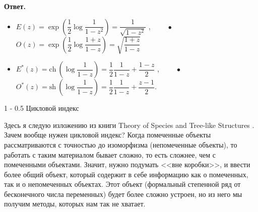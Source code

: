 \documentclass{article}
\makeatletter
\theoremstyle{definition}
\renewcommand{\section}{\@startsection
{section}%
{1}%
{\z@}%
{-\baselineskip}%
{0.5\baselineskip}%
{\centering\large\scshape}} %
\makeatother
\begin{document}
\textbf{Ответ.}

\begin{itemize}
	\item \( E(z) = \exp\left(\dfrac12 \log \dfrac{1}{1-z^2}\right) = 
	\dfrac{1}{\sqrt{1 - z^2}} \) , 
	\( \qquad \bullet \) \( O(z) = \exp\left(\dfrac12 \log 
	\dfrac{1+z}{1-z}\right) = 
	\sqrt{\dfrac{1+z}{1-z}} \)
	\item \( E^{*}(z) = \mathrm{ch}\ \left(\log \dfrac{1}{1 - z}\right) = 
	\dfrac12 \dfrac{1}{1 - z} + \dfrac{1 - z}{2} \) , \( \qquad \bullet \)
	\( O^{*}(z) = \mathrm{sh}\ \left( \log \dfrac{1}{1 - z}\right) = 
	\dfrac12\dfrac{1}{1 - z} + \dfrac{z - 1}{2} \).
\end{itemize}

\section{Цикловой индекс}

Здесь я следую изложению из книги Theory of Species and Tree-like Structures 
\cite{species}. Зачем вообще нужен цикловой индекс? Когда помеченные
объекты рассматриваются с точностью до изоморфизма (непомеченные объекты), то
работать с таким материалом бывает сложно, то есть сложнее, чем с помеченными
объектами. Значит, нужно подумать <<вне коробки>>, и ввести более общий объект,
который содержит в себе информацию как о помеченных, так и о непомеченных
объектах. Этот объект (формальный степенной ряд от бесконечного числа
переменных) будет более сложно устроен, но из него мы получим методы, которых
нам так не хватает.
\end{document}
